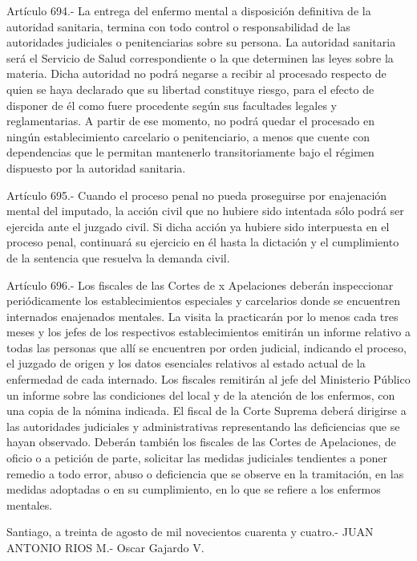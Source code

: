     Artículo 694.- La entrega del enfermo mental a disposición definitiva de la autoridad sanitaria, termina con todo control o responsabilidad de las autoridades judiciales o penitenciarias sobre su persona.
    La autoridad sanitaria será el Servicio de Salud correspondiente o la que determinen las leyes sobre la materia.
    Dicha autoridad no podrá negarse a recibir al procesado respecto de quien se haya declarado que su libertad constituye riesgo, para el efecto de disponer de él como fuere procedente según sus facultades legales y reglamentarias. A partir de ese momento, no podrá quedar el procesado en ningún establecimiento carcelario o penitenciario, a menos que cuente con dependencias que le permitan mantenerlo transitoriamente bajo el régimen dispuesto por la autoridad sanitaria.


    Artículo 695.- Cuando el proceso penal no pueda proseguirse por enajenación mental del imputado, la acción civil que no hubiere sido intentada sólo podrá ser ejercida ante el juzgado civil. Si dicha acción ya hubiere sido interpuesta en el proceso penal, continuará su ejercicio en él hasta la dictación y el cumplimiento de la sentencia que resuelva la demanda civil.

    Artículo 696.- Los fiscales de las Cortes de  x Apelaciones deberán inspeccionar periódicamente los establecimientos especiales y carcelarios donde se encuentren internados enajenados mentales. La visita la practicarán por lo menos cada tres meses y los jefes de los respectivos establecimientos emitirán un informe relativo a todas las personas que allí se encuentren por orden judicial, indicando el proceso, el juzgado de origen y los datos esenciales relativos al estado actual de la enfermedad de cada internado.
    Los fiscales remitirán al jefe del Ministerio Público un informe sobre las condiciones del local y de la atención de los enfermos, con una copia de la nómina indicada. El fiscal de la Corte Suprema deberá dirigirse a las autoridades judiciales y administrativas representando las deficiencias que se hayan observado.
    Deberán también los fiscales de las Cortes de Apelaciones, de oficio o a petición de parte, solicitar las medidas judiciales tendientes a poner remedio a todo error, abuso o deficiencia que se observe en la tramitación, en las medidas adoptadas o en su cumplimiento, en lo que se refiere a los enfermos mentales.

    Santiago, a treinta de agosto de mil novecientos cuarenta y cuatro.- JUAN ANTONIO RIOS M.- Oscar Gajardo V.
